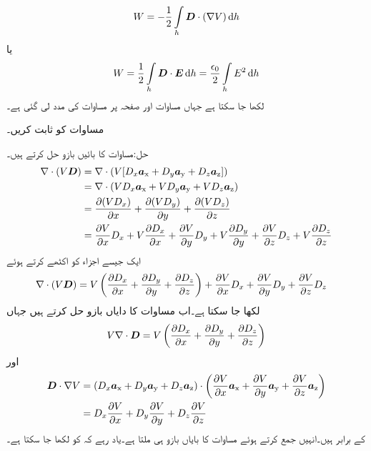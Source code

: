 \begin{align*}
W=-\frac{1}{2} \int \limits_h \kvec{D} \cdot (\nabla V) \dif h
\end{align*}
یا
\begin{align}\label{مساوات_توانائی_کثافت_تونائی_ب}
W=\frac{1}{2} \int \limits_h \kvec{D} \cdot \kvec{E} \dif h=\frac{\epsilon_0}{2}\int \limits_h  E^2 \dif h
\end{align}
لکھا جا سکتا ہے جہاں  مساوات  اور صفحہ  پر مساوات  کی مدد لی گئی ہے۔

مساوات  کو ثابت کریں۔

حل:مساوات  کا بائیں بازو حل کرتے ہیں۔
\begin{align*}
\nabla \cdot (V {{\boldsymbol{D}}})&=\nabla \cdot (V[D_x{\boldsymbol{a}}_{\textup{x}}+D_y{\boldsymbol{a}}_{\textup{y}}+D_z{\boldsymbol{a}}_{\textup{z}}])\\
&=\nabla \cdot (V D_x{\boldsymbol{a}}_{\textup{x}}+V D_y{\boldsymbol{a}}_{\textup{y}}+VD_z{\boldsymbol{a}}_{\textup{z}})\\
&=\frac{\partial (V D_x)}{\partial x}+\frac{\partial (V D_y)}{\partial y}+\frac{\partial (V D_z)}{\partial z}\\
&=\frac{\partial V}{\partial x} D_x +V\frac{\partial D_x}{\partial x}+\frac{\partial V}{\partial y} D_y +V\frac{\partial D_y}{\partial y}+\frac{\partial V}{\partial z} D_z +V\frac{\partial D_z}{\partial z}
\end{align*}
ایک جیسے اجزاء کو اکٹھے کرتے ہوئے
\begin{align*}
\nabla \cdot (V {{\boldsymbol{D}}})&=V\left(\frac{\partial D_x}{\partial x}+\frac{\partial D_y}{\partial y}+\frac{\partial D_z}{\partial z}\right)+\frac{\partial V}{\partial x} D_x +\frac{\partial V}{\partial y} D_y +\frac{\partial V}{\partial z} D_z 
\end{align*}
لکھا جا سکتا ہے۔اب مساوات  کا دایاں بازو حل کرتے ہیں جہاں 
\begin{align*}
V \nabla \cdot {\ensuremath{{\boldsymbol{D}}}}=V \left(\frac{\partial D_x}{\partial x}+\frac{\partial D_y}{\partial y}+\frac{\partial D_z}{\partial z} \right)
\end{align*}
اور
\begin{align*}
{\ensuremath{{\boldsymbol{D}}}} \cdot \nabla V&=(D_x{\boldsymbol{a}}_{\textup{x}}+D_y{\boldsymbol{a}}_{\textup{y}}+D_z{\boldsymbol{a}}_{\textup{z}}) \cdot \left(\frac{\partial V}{\partial x}{\boldsymbol{a}}_{\textup{x}} +\frac{\partial V}{\partial y}{\boldsymbol{a}}_{\textup{y}}+\frac{\partial V}{\partial z}{\boldsymbol{a}}_{\textup{z}}\right)\\
&= D_x\frac{\partial V}{\partial x} + D_y\frac{\partial V}{\partial y} +D_z\frac{\partial V}{\partial z}  
\end{align*}
کے برابر ہیں۔انہیں جمع کرتے ہوئے مساوات  کا بایاں بازو ہی ملتا ہے۔یاد رہے کہ  کو  لکھا جا سکتا  ہے۔

